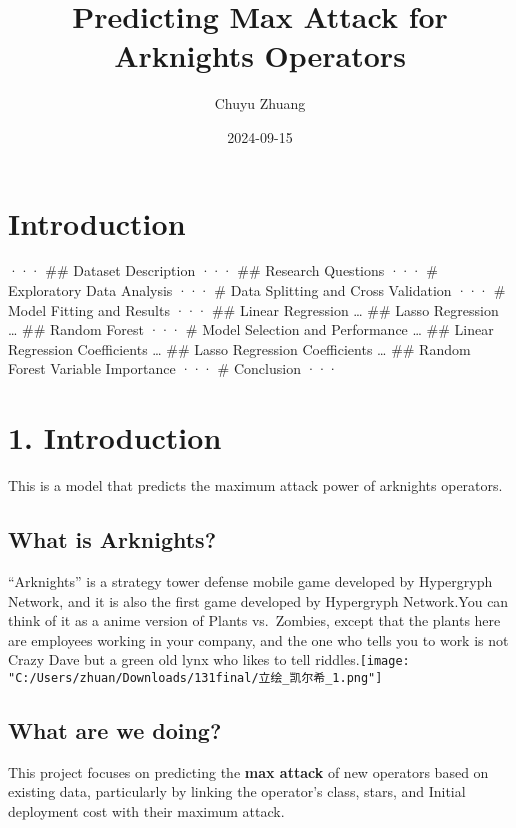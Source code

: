 \documentclass[
]{article}
\title{Predicting Max Attack for Arknights Operators}
\author{Chuyu Zhuang}
\date{2024-09-15}
\begin{document}
\maketitle

{
\setcounter{tocdepth}{2}
\tableofcontents
}
\section{Introduction}\label{introduction}

··· \#\# Dataset Description ··· \#\# Research Questions ··· \#
Exploratory Data Analysis ··· \# Data Splitting and Cross Validation ···
\# Model Fitting and Results ··· \#\# Linear Regression \ldots{} \#\#
Lasso Regression \ldots{} \#\# Random Forest ··· \# Model Selection and
Performance \ldots{} \#\# Linear Regression Coefficients \ldots{} \#\#
Lasso Regression Coefficients \ldots{} \#\# Random Forest Variable
Importance ··· \# Conclusion ···

\section{1. Introduction}\label{introduction-1}

This is a model that predicts the maximum attack power of arknights
operators.

\subsection{What is Arknights?}\label{what-is-arknights}

``Arknights'' is a strategy tower defense mobile game developed by
Hypergryph Network, and it is also the first game developed by
Hypergryph Network.You can think of it as a anime version of Plants
vs.~Zombies, except that the plants here are employees working in your
company, and the one who tells you to work is not Crazy Dave but a green
old lynx who likes to tell
riddles.\texttt{[image: "C:/Users/zhuan/Downloads/131final/立绘\_凯尔希\_1.png"]}

\subsection{What are we doing?}\label{what-are-we-doing}

This project focuses on predicting the \textbf{max attack} of new
operators based on existing data, particularly by linking the operator's
class, stars, and Initial deployment cost with their maximum attack.
\end{document}
